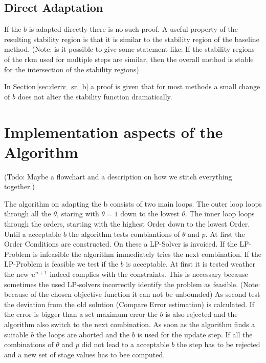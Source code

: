 \documentclass{article}
\begin{document}
\subsection{Direct Adaptation}
If the $b$ is adapted directly there is no such proof.
A useful property of the resulting stability region is that it is similar to the stability region of the baseline method. 
(Note: is it possible to give some statement like: If the stability regions of the rkm used for multiple steps are similar, then the overall method is stable for the intersection of the stability regions)

In Section\,\ref{sec:deriv_sr_b} a proof is given that for most methods a small change of $b$ does not alter the stability function dramatically.






\section{Implementation aspects of the Algorithm}

(Todo: Maybe a flowchart and a description on how we stitch everything together.) 

The algorithm on adapting the b consists of two main loops. The outer loop loops through all the $\theta$, staring with $\theta = 1$ down to the lowest $\theta$. The inner loop loops through the orders, starting with the highest Order down to the lowest Order. 
Until a acceptable $b$ the algorithm tests combiantions of $\theta$ and $p$. At first the Order Conditions are constructed. On these a LP-Solver is invoiced. If the LP-Problem is infeasible the algorithm immediately tries the next combination. If the LP-Problem is feasible we test if the $b$ is acceptable. At first it is tested weather the new $u^{n+1}$ indeed complies with the constraints. This is necessary because sometimes the used LP-solvers incorrectly identify the problem as feasible. (Note: because of the chosen objective function it can not be unbounded) As second test the deviation from the old solution (Compare Error estimation) is calculated. If the error is bigger than a set maximum error the $b$ is also rejected and the algorithm also switch to the next combination.
As soon as the algorithm finds a suitable $b$ the loops are aborted and the $b$ is used for the update step.
If all the combinations of $\theta$ and $p$ did not lead to a acceptable $b$ the step has to be rejected and a new set of stage values has to bee computed.
\end{document}

